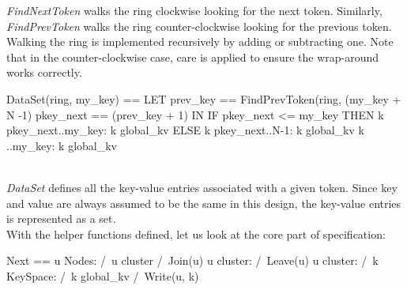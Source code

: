 \textit{FindNextToken} walks the ring clockwise looking for the next token.
Similarly, \textit{FindPrevToken} walks the ring counter-clockwise looking for the
previous token. Walking the ring is implemented recursively by adding or 
subtracting one. Note that in the counter-clockwise case, care is applied to
ensure the wrap-around works correctly.\\

\begin{tla}
DataSet(ring, my_key) == 
    LET 
        prev_key == FindPrevToken(ring, (my_key + N -1) %
        pkey_next == (prev_key + 1) %
    IN 
        IF pkey_next <= my_key THEN
            {k \in pkey_next..my_key: k \in global_kv}
        ELSE 
            {k \in pkey_next..N-1: k \in global_kv} \cup
            {k ..my_key: k \in global_kv}
\end{tla}
\begin{tlatex}
%
%
%
%
%
%
\end{tlatex}
\\

\textit{DataSet} defines all the key-value entries associated with a given
token. Since key and value are always assumed to be the same in this design, the
key-value entries is represented as a set.\\

With the helper functions defined, let us look at the core part of specification:\\
\begin{tla}
Next ==
    \/ \E u \in Nodes:
        /\ u \notin cluster
        /\ Join(u) 
    \/ \E u \in cluster:
        /\ Leave(u) 
    \/ \E u \in cluster:
        /\ \E k \in KeySpace:
            /\ k \notin global_kv
            /\ Write(u, k)
\end{tla}
\begin{tlatex}
%
%
%
%
%
%
%
%
%
%
\end{tlatex}
\\

